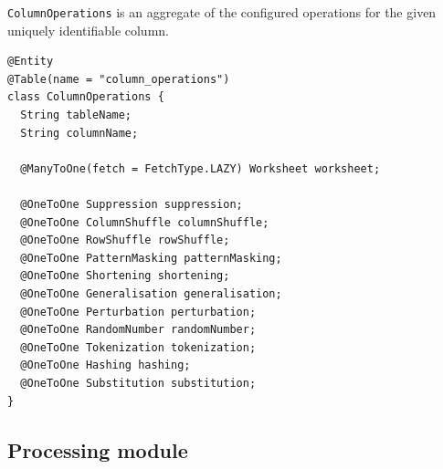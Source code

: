 \documentclass[a4paper,twoside,12pt]{book}
\begin{document}
\verb|ColumnOperations| is an aggregate of the configured operations for the given uniquely identifiable column. \newline

\begin{verbatim}
@Entity
@Table(name = "column_operations")
class ColumnOperations {
  String tableName;
  String columnName;

  @ManyToOne(fetch = FetchType.LAZY) Worksheet worksheet;

  @OneToOne Suppression suppression;
  @OneToOne ColumnShuffle columnShuffle;
  @OneToOne RowShuffle rowShuffle;
  @OneToOne PatternMasking patternMasking;
  @OneToOne Shortening shortening;
  @OneToOne Generalisation generalisation;
  @OneToOne Perturbation perturbation;
  @OneToOne RandomNumber randomNumber;
  @OneToOne Tokenization tokenization;
  @OneToOne Hashing hashing;
  @OneToOne Substitution substitution;
}
\end{verbatim}

\subsection{Processing module}
\end{document}
